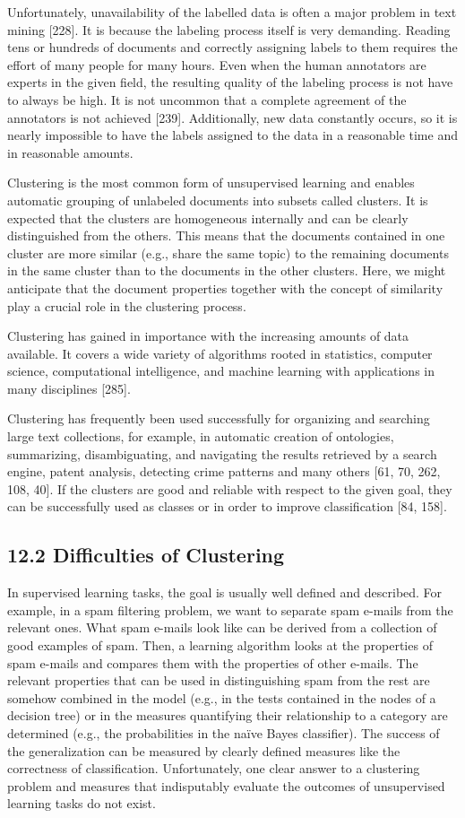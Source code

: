 \documentclass[10pt]{book}
\begin{document}
Unfortunately, unavailability of the labelled data is often a major problem in text mining [228]. It is because the labeling process itself is very demanding. Reading tens or hundreds of documents and correctly assigning labels to them requires the effort of many people for many hours. Even when the human annotators are experts in the given field, the resulting quality of the labeling process is not have to always be high. It is not uncommon that a complete agreement of the annotators is not achieved [239]. Additionally, new data constantly occurs, so it is nearly impossible to have the labels assigned to the data in a reasonable time and in reasonable amounts.

Clustering is the most common form of unsupervised learning and enables automatic grouping of unlabeled documents into subsets called clusters. It is expected that the clusters are homogeneous internally and can be clearly distinguished from the others. This means that the documents contained in one cluster are more similar (e.g., share the same topic) to the remaining documents in the same cluster than to the documents in the other clusters. Here, we might anticipate that the document properties together with the concept of similarity play a crucial role in the clustering process.

Clustering has gained in importance with the increasing amounts of data available. It covers a wide variety of algorithms rooted in statistics, computer science, computational intelligence, and machine learning with applications in many disciplines [285].

Clustering has frequently been used successfully for organizing and searching large text collections, for example, in automatic creation of ontologies, summarizing, disambiguating, and navigating the results retrieved by a search engine, patent analysis, detecting crime patterns and many others [61, 70, 262, 108, 40]. If the clusters are good and reliable with respect to the given goal, they can be successfully used as classes or in order to improve classification [84, 158].

\subsection*{12.2 Difficulties of Clustering}
In supervised learning tasks, the goal is usually well defined and described. For example, in a spam filtering problem, we want to separate spam e-mails from the relevant ones. What spam e-mails look like can be derived from a collection of good examples of spam. Then, a learning algorithm looks at the properties of spam e-mails and compares them with the properties of other e-mails. The relevant properties that can be used in distinguishing spam from the rest are somehow combined in the model (e.g., in the tests contained in the nodes of a decision tree) or in the measures quantifying their relationship to a category are determined (e.g., the probabilities in the naïve Bayes classifier). The success of the generalization can be measured by clearly defined measures like the correctness of classification. Unfortunately, one clear answer to a clustering problem and measures that indisputably evaluate the outcomes of unsupervised learning tasks do not exist.
\end{document}
